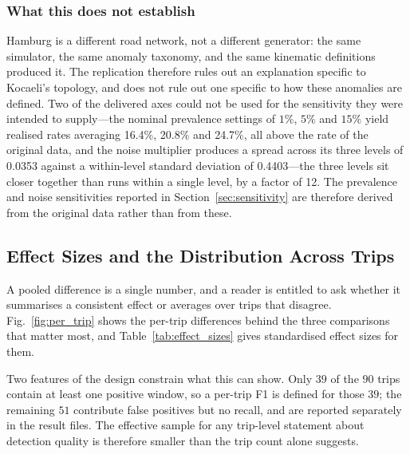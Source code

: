 \documentclass[journal]{IEEEtran}
\begin{document}
\subsubsection{What this does not establish}
Hamburg is a different road network, not a different generator: the same
simulator, the same anomaly taxonomy, and the same kinematic definitions
produced it. The replication therefore rules out an explanation specific to
Kocaeli's topology, and does not rule out one specific to how these anomalies
are defined. Two of the delivered axes could not be used for the sensitivity
they were intended to supply---the nominal prevalence settings of $1\%$, $5\%$
and $15\%$ yield realised rates averaging 16.4\%, 20.8\% and 24.7\%,
all above the rate of the original data, and the noise multiplier produces a
spread across its three levels of 0.0353 against a within-level
standard deviation of 0.4403---the three levels sit closer together than runs within a single level, by a factor of 12.
The prevalence and noise sensitivities reported in
Section~\ref{sec:sensitivity} are therefore derived from the original data
rather than from these.

\subsection{Effect Sizes and the Distribution Across Trips}
\label{sec:effect_sizes}
A pooled difference is a single number, and a reader is entitled to ask whether it summarises a consistent effect or averages over trips that disagree. Fig.~\ref{fig:per_trip} shows the per-trip differences behind the three comparisons that matter most, and Table~\ref{tab:effect_sizes} gives standardised effect sizes for them.

Two features of the design constrain what this can show. Only $39$ of the $90$ trips contain at least one positive window, so a per-trip F1 is defined for those $39$; the remaining $51$ contribute false positives but no recall, and are reported separately in the result files. The effective sample for any trip-level statement about detection quality is therefore smaller than the trip count alone suggests.
\end{document}
